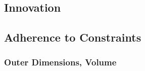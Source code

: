 \documentclass{report}
\begin{document}
\subsection{Innovation}





\subsection{Adherence to Constraints}



\subsubsection{Outer Dimensions, Volume} 



\end{document}
